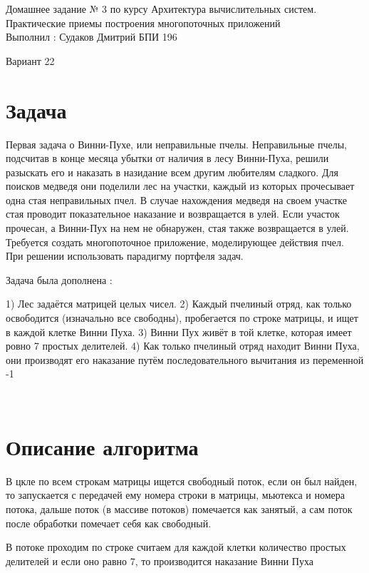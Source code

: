 \documentclass[14pt,a4paper]{article}
\begin{document}
    \begin{titlepage}
        \newpage
         \begin{center}

            Домашнее задание № 3 по курсу Архитектура вычислительных систем.\\
            Практические приемы построения многопоточных приложений\\

            Выполнил : Судаков Дмитрий БПИ 196

            Вариант 22
         \end{center}

    \end{titlepage}


    \section{Задача}
    \par{
        Первая задача о Винни-Пухе, или неправильные пчелы.
        Неправильные пчелы, подсчитав в конце месяца убытки от наличия в лесу
        Винни-Пуха, решили разыскать его и наказать в назидание всем другим
        любителям сладкого. Для поисков медведя они поделили лес на участки,
        каждый из которых прочесывает одна стая неправильных пчел. В случае
        нахождения медведя на своем участке стая проводит показательное
        наказание и возвращается в улей. Если участок прочесан, а Винни-Пух на
        нем не обнаружен, стая также возвращается в улей. Требуется создать
        многопоточное приложение, моделирующее действия пчел. При решении
        использовать парадигму портфеля задач.

        Задача была дополнена : 

        1) Лес задаётся матрицей целых чисел.
        2) Каждый пчелиный отряд, как только освободится (изначально все свободны), пробегается по строке матрицы, и ищет в каждой клетке Винни Пуха.
        3) Винни Пух живёт в той клетке, которая имеет ровно 7 простых делителей.
        4) Как только пчелиный отряд находит Винни Пуха, они производят его наказание путём последовательного вычитания из переменной -1
    }\\
    
    \section{Описание алгоритма}
    \par{
        В цкле по всем строкам матрицы ищется свободный поток, если он был найден, то запускается с передачей ему номера строки в матрицы, мьютекса и номера потока, дальше поток (в массиве потоков) помечается как занятый,  а сам поток после обработки помечает себя как свободный.

        В потоке проходим по строке считаем для каждой клетки количество простых делителей и если оно равно 7, то производится наказание Винни Пуха
    }
\end{document}
